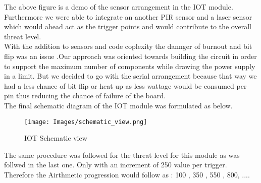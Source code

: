 \documentclass[letterpaper, 10 pt, conference]{ieeeconf}  %
\begin{document}
The above figure is a demo of the sensor arrangement in the IOT module. Furthermore we were able to integrate an another PIR sensor and a laser sensor which would ahead act as the trigger points and would contribute to the overall threat level.\\

With the addition to sensors and code coplexity the dannger of burnout and bit flip was an issue .Our approach was oriented towards building the circuit in order to support the maximum number of components while drawing the power supply in a limit. But we decided to go with the serial arrangement because that way we had a less chance of bit flip or heat up as less wattage would be consumed per pin thus reducing the chance of failure of the board.\\
The final schematic diagram of the IOT module was formulated as below.\cite{c4}\\

\begin{figure}[thpb]
      \centering
      {{\texttt{[image: Images/schematic\_view.png]}}}
      \caption{IOT Schematic view}
      \label{fig:2}
\end{figure}

The same procedure was followed for the threat level for this module as was follwed in the last one. Only with an increment of 250 value per trigger. Therefore the Airthmetic progression would follow as : 100 , 350 , 550 , 800, ....
\end{document}
